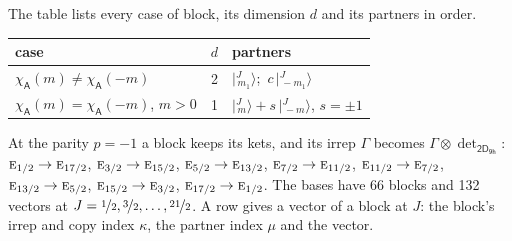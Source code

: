 \documentclass[10pt,a4paper]{article}
\numberwithin{equation}{section}
\newcommand{\grp}[1]{\mathsf{#1}}
\newcommand{\irr}[1]{\text{\normalfont\scshape #1}}
\newcommand{\chiA}{\chi_{\grp{A}}}
\newcommand{\irrprod}{\otimes}
\newcommand{\mult}{\kappa}
\newcommand{\intx}{\mu}
\newcommand{\jm}[2]{\bigl\lvert{}^{#1}_{\,#2}\bigr\rangle}
\begin{document}
\leavevmode\label{n:head.case}\label{n:head.partners}The table lists every case of block, its dimension $d$ and its partners in order.
\begin{center}\begin{tabular}{@{}lrl@{}}\toprule
case & $d$ & partners\\\midrule
$\chiA(m) \ne \chiA(-m)$ & 2 & $\jm{J}{m_1}$;\ $c\,\jm{J}{-m_1}$\\
$\chiA(m) = \chiA(-m)$, $m > 0$ & 1 & $\jm{J}{m} + s\,\jm{J}{-m}$, $s = \pm1$\\
\bottomrule\end{tabular}\end{center}
At the parity $p = -1$ a block keeps its kets, and its irrep $\Gamma$ becomes $\Gamma \irrprod \det_{\grp{2D_{9h}}}$: $\irr{e}_{1/2} \to \irr{e}_{17/2}$, $\irr{e}_{3/2} \to \irr{e}_{15/2}$, $\irr{e}_{5/2} \to \irr{e}_{13/2}$, $\irr{e}_{7/2} \to \irr{e}_{11/2}$, $\irr{e}_{11/2} \to \irr{e}_{7/2}$, $\irr{e}_{13/2} \to \irr{e}_{5/2}$, $\irr{e}_{15/2} \to \irr{e}_{3/2}$, $\irr{e}_{17/2} \to \irr{e}_{1/2}$.
The bases have 66 blocks and 132 vectors at $J = \nicefrac{1}{2}, \nicefrac{3}{2}, \dots, \nicefrac{21}{2}$. \label{n:head.vector}A row gives a vector of a block at $J$: the block's irrep and copy index $\mult$, the partner index $\intx$ and the vector.
\end{document}
